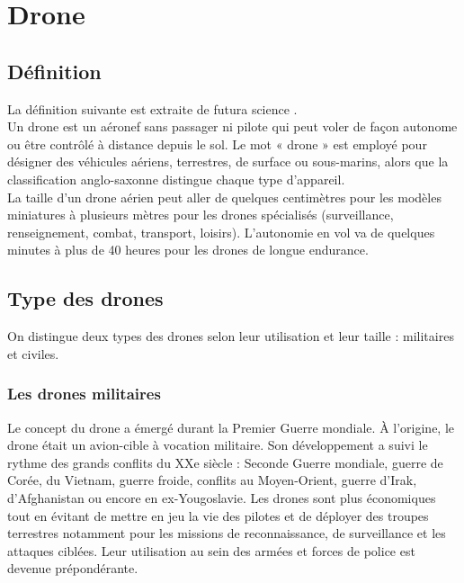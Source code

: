 
\chapter{Drone}

\section{Définition}
La définition suivante est extraite de futura science \cite{futura}.~\\

Un drone est un aéronef sans passager ni pilote qui peut voler de façon autonome ou être contrôlé à distance depuis le sol. Le mot « drone » est employé pour désigner des véhicules aériens, terrestres, de surface ou sous-marins, alors que la classification anglo-saxonne distingue chaque type d’appareil.  ~\\

La taille d’un drone aérien peut aller de quelques centimètres pour les modèles miniatures à plusieurs mètres pour les drones spécialisés (surveillance, renseignement, combat, transport, loisirs). L’autonomie en vol va de quelques minutes à plus de 40 heures pour les drones de longue endurance.  

\section{Type des drones}

On distingue deux types des drones selon leur utilisation et leur taille : militaires et civiles. 

\subsection{Les drones militaires}

Le concept du drone a émergé durant la Premier Guerre mondiale. À l’origine, le drone était un avion-cible à vocation militaire. Son développement a suivi le rythme des grands conflits du XXe siècle : Seconde Guerre mondiale, guerre de Corée, du Vietnam, guerre froide, conflits au Moyen-Orient, guerre d’Irak, d’Afghanistan ou encore en ex-Yougoslavie. Les drones sont plus économiques tout en évitant de mettre en jeu la vie des pilotes et de déployer des troupes terrestres notamment pour les missions de reconnaissance, de surveillance et les attaques ciblées. Leur utilisation au sein des armées et forces de police est devenue prépondérante.  ~\\

